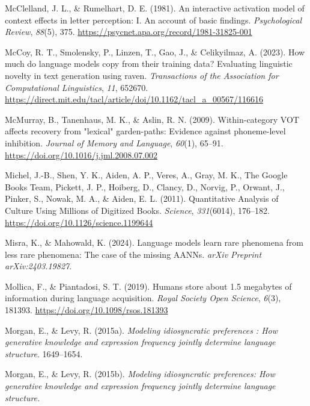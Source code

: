 \documentclass[
  12pt,
  letterpaper,
]{scrreprt}
\newlength{\cslhangindent}
\newenvironment{CSLReferences}[2] %
 {\begin{list}{}{%
  \setlength{\itemindent}{0pt}
  \setlength{\leftmargin}{0pt}
  \setlength{\parsep}{0pt}
  \ifodd #1
   \setlength{\leftmargin}{\cslhangindent}
   \setlength{\itemindent}{-1\cslhangindent}
  \fi
  \setlength{\itemsep}{#2\baselineskip}}}
 {\end{list}}
\begin{document}
\begin{CSLReferences}{1}{0}
McClelland, J. L., \& Rumelhart, D. E. (1981). An interactive activation
model of context effects in letter perception: I. An account of basic
findings. \emph{Psychological Review}, \emph{88}(5), 375.
\url{https://psycnet.apa.org/record/1981-31825-001}

McCoy, R. T., Smolensky, P., Linzen, T., Gao, J., \& Celikyilmaz, A.
(2023). How much do language models copy from their training data?
Evaluating linguistic novelty in text generation using raven.
\emph{Transactions of the Association for Computational Linguistics},
\emph{11}, 652670.
\url{https://direct.mit.edu/tacl/article/doi/10.1162/tacl_a_00567/116616}

McMurray, B., Tanenhaus, M. K., \& Aslin, R. N. (2009). Within-category
VOT affects recovery from {"}lexical{"} garden-paths: Evidence against
phoneme-level inhibition. \emph{Journal of Memory and Language},
\emph{60}(1), 65--91. \url{https://doi.org/10.1016/j.jml.2008.07.002}

Michel, J.-B., Shen, Y. K., Aiden, A. P., Veres, A., Gray, M. K., The
Google Books Team, Pickett, J. P., Hoiberg, D., Clancy, D., Norvig, P.,
Orwant, J., Pinker, S., Nowak, M. A., \& Aiden, E. L. (2011).
Quantitative Analysis of Culture Using Millions of Digitized Books.
\emph{Science}, \emph{331}(6014), 176--182.
\url{https://doi.org/10.1126/science.1199644}

Misra, K., \& Mahowald, K. (2024). Language models learn rare phenomena
from less rare phenomena: The case of the missing AANNs. \emph{arXiv
Preprint arXiv:2403.19827}.

Mollica, F., \& Piantadosi, S. T. (2019). Humans store about 1.5
megabytes of information during language acquisition. \emph{Royal
Society Open Science}, \emph{6}(3), 181393.
\url{https://doi.org/10.1098/rsos.181393}

Morgan, E., \& Levy, R. (2015a). \emph{Modeling idiosyncratic
preferences : How generative knowledge and expression frequency jointly
determine language structure}. 1649--1654.

Morgan, E., \& Levy, R. (2015b). \emph{Modeling idiosyncratic
preferences: How generative knowledge and expression frequency jointly
determine language structure.}


\end{CSLReferences}
\end{document}
